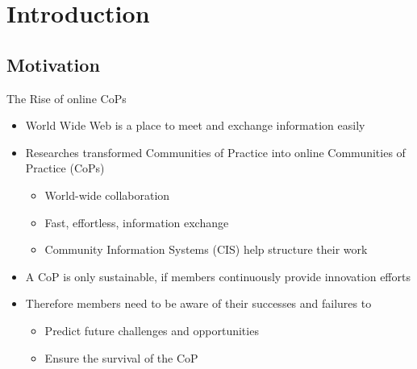 \section{Introduction}

\subsection{Motivation}


\begin{frame}{The Rise of online CoPs}
  \begin{itemize}
    \item World Wide Web is a place to meet and exchange information easily
    \item Researches transformed Communities of Practice into online Communities of Practice (CoPs)
          \begin{itemize}
            \item World-wide collaboration
            \item Fast, effortless, information exchange
            \item Community Information Systems (CIS) help structure their work
          \end{itemize}
    \item A CoP is only sustainable, if members continuously provide innovation efforts \cite{RKJa15}
    \item Therefore members need to be aware of their successes and failures to 
    \begin{itemize}
        \item Predict future challenges and opportunities
        \item Ensure the survival of the CoP
    \end{itemize}
  \end{itemize}

\end{frame}

